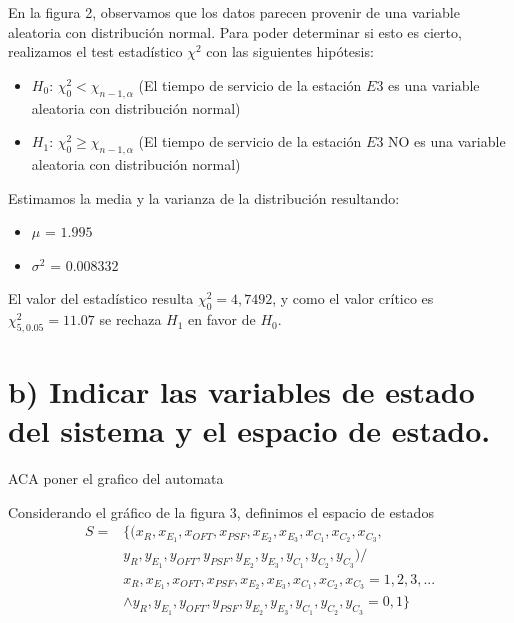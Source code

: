 \documentclass{article}
\numberwithin{equation}{section}
\numberwithin{figure}{section}
\numberwithin{table}{section}
\begin{document}
En la figura 2, observamos que los datos parecen provenir de una variable aleatoria con distribuci\'on normal.
Para poder determinar si esto es cierto, realizamos el test estad\'istico $\chi^2$ con las siguientes hip\'otesis:

\begin{itemize}
 \item {$H_{0}$:} $\chi_{0}^2 < \chi_{n-1,\alpha}$ (El tiempo de servicio de la estaci\'on $E3$ es una variable aleatoria con distribuci\'on normal)
 \item {$H_{1}$:} $\chi_{0}^2 \ge \chi_{n-1,\alpha}$ (El tiempo de servicio de la estaci\'on $E3$ NO es una variable aleatoria con distribuci\'on normal)
\end{itemize}

Estimamos la media y la varianza de la distribuci\'on resultando:
\begin{itemize}
 \item {$\mu$ =} $1.995$
 \item {$\sigma^2$ =}  $0.008332$
\end{itemize}

El valor del estad\'istico resulta $\chi_{0}^2 = 4,7492$, y como el valor
cr\'itico es $\chi_{5,0.05}^2 = 11.07$ se rechaza $H_1$ en favor de $H_0$.

\section*{b) Indicar las variables de estado del sistema y el espacio de estado.}

ACA poner el grafico del automata

Considerando el gr\'afico de la figura 3,  definimos el espacio de estados
\begin{align*}
 S =& \{ ( x_R, x_{E_1}, x_{OFT}, x_ {PSF}, x_{E_2}, x_{E_3}, x_{C_1}, x_{C_2}, x_{C_3}, \\
&y_R, y_{E_1}, y_{OFT}, y_ {PSF}, y_{E_2}, y_{E_3}, y_{C_1}, y_{C_2}, y_{C_3} ) / \\
& x_R, x_{E_1}, x_{OFT}, x_ {PSF}, x_{E_2}, x_{E_3}, x_{C_1}, x_{C_2}, x_{C_3} = 1, 2, 3, ...\\
    & \wedge y_R, y_{E_1}, y_{OFT}, y_ {PSF}, y_{E_2}, y_{E_3}, y_{C_1}, y_{C_2}, y_{C_3} =  0, 1  \}
\end{align*}
\end{document}
